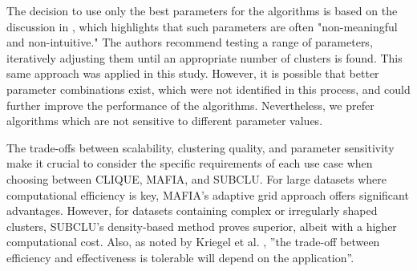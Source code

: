 The decision to use only the best parameters for the algorithms is based on the discussion in \cite[p.~352]{sim-2012}, which highlights that such parameters are often "non-meaningful and non-intuitive." The authors recommend testing a range of parameters, iteratively adjusting them until an appropriate number of clusters is found. This same approach was applied in this study. However, it is possible that better parameter combinations exist, which were not identified in this process, and could further improve the performance of the algorithms. Nevertheless, we prefer algorithms which are not sensitive to different parameter values.

The trade-offs between scalability, clustering quality, and parameter sensitivity make it crucial to consider the specific requirements of each use case when choosing between CLIQUE, MAFIA, and SUBCLU. For large datasets where computational efficiency is key, MAFIA's adaptive grid approach offers significant advantages. However, for datasets containing complex or irregularly shaped clusters, SUBCLU's density-based method proves superior, albeit with a higher computational cost. Also, as noted by Kriegel et al. \cite[p.1:50]{kriegel-2009}, ''the trade-off between efficiency and effectiveness is tolerable will depend on the application''.